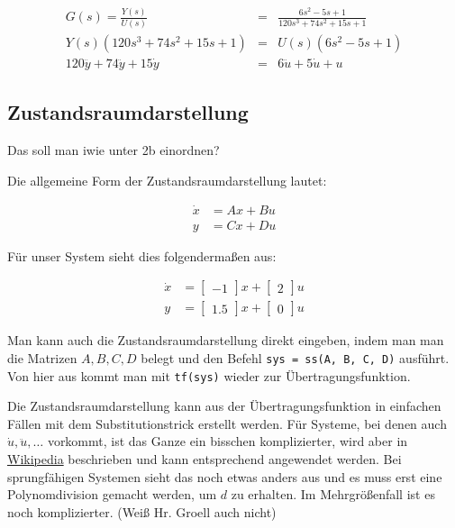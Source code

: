\begin{eqnarray*}
    G(s) =\frac{Y(s)}{U(s)} &=& \frac{6s^2 - 5s + 1}{120s^3 + 74s^2 + 15s +1} \\
    Y(s)(120s^3 + 74s^2 + 15s +1) &=& U(s) (6s^2 - 5s + 1) \\
    120 \dddot y + 74 \ddot y + 15 \dot y &=& 6 \ddot u + 5 \dot u + u
\end{eqnarray*}

\subsection{Zustandsraumdarstellung}
Das soll man iwie unter 2b einordnen?

Die allgemeine Form der Zustandsraumdarstellung lautet:

\begin{align*}
    \dot x & = Ax + Bu \nonumber \\
    y & = Cx + Du
\end{align*}

Für unser System sieht dies folgendermaßen aus:


\begin{subequations}
    \begin{align}
        \dot x & = \begin{bmatrix}
            -1
        \end{bmatrix}x + \begin{bmatrix}
            2
        \end{bmatrix}u \\
        y & = \begin{bmatrix}
            1.5
        \end{bmatrix}x + \begin{bmatrix}
            0
        \end{bmatrix}u
    \end{align}
\end{subequations}

Man kann auch die Zustandsraumdarstellung direkt eingeben, indem man man die Matrizen $A, B, C, D$ belegt und den Befehl \texttt{sys = ss(A, B, C, D)} ausführt. Von hier aus kommt man mit \texttt{tf(sys)} wieder zur Übertragungsfunktion.

Die Zustandsraumdarstellung kann aus der Übertragungsfunktion in einfachen Fällen mit dem Substitutionstrick erstellt werden. Für Systeme, bei denen auch $\dot u, \ddot u, \ldots$ vorkommt, ist das Ganze ein bisschen komplizierter, wird aber in \href{https://de.wikipedia.org/wiki/Zustandsraumdarstellung#Regelungsnormalform}{Wikipedia} beschrieben und kann entsprechend angewendet werden.
Bei sprungfähigen Systemen sieht das noch etwas anders aus und es muss erst eine Polynomdivision gemacht werden, um $d$ zu erhalten. Im Mehrgrößenfall ist es noch komplizierter. (Weiß Hr. Groell auch nicht)

